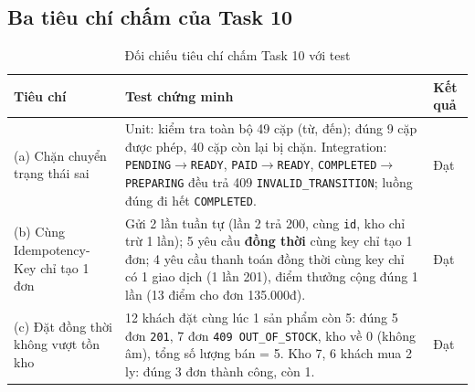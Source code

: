 \documentclass[a4paper]{article}
\newcommand{\st}[1]{\texttt{#1}}
\newcommand{\ra}{\ensuremath{\rightarrow}}
\begin{document}
\subsection{Ba tiêu chí chấm của Task 10}
\begin{table}[h!]
\centering
\begin{tabularx}{\textwidth}{|L{2.6cm}|X|L{3.2cm}|}
\hline
\textbf{Tiêu chí} & \textbf{Test chứng minh} & \textbf{Kết quả} \\ \hline
(a) Chặn chuyển trạng thái sai & Unit: kiểm tra toàn bộ 49 cặp (từ, đến); đúng 9 cặp được phép, 40 cặp còn lại bị chặn. Integration: \st{PENDING}\ra\st{READY}, \st{PAID}\ra\st{READY}, \st{COMPLETED}\ra\st{PREPARING} đều trả 409 \texttt{INVALID\_TRANSITION}; luồng đúng đi hết \st{COMPLETED}. & Đạt \\ \hline
(b) Cùng Idempotency-Key chỉ tạo 1 đơn & Gửi 2 lần tuần tự (lần 2 trả 200, cùng \texttt{id}, kho chỉ trừ 1 lần); 5 yêu cầu \textbf{đồng thời} cùng key chỉ tạo 1 đơn; 4 yêu cầu thanh toán đồng thời cùng key chỉ có 1 giao dịch (1 lần 201), điểm thưởng cộng đúng 1 lần (13 điểm cho đơn 135.000đ). & Đạt \\ \hline
(c) Đặt đồng thời không vượt tồn kho & 12 khách đặt cùng lúc 1 sản phẩm còn 5: đúng 5 đơn \texttt{201}, 7 đơn \texttt{409 OUT\_OF\_STOCK}, kho về 0 (không âm), tổng số lượng bán = 5. Kho 7, 6 khách mua 2 ly: đúng 3 đơn thành công, còn 1. & Đạt \\ \hline
\end{tabularx}
\caption{Đối chiếu tiêu chí chấm Task 10 với test}
\end{table}
\end{document}
